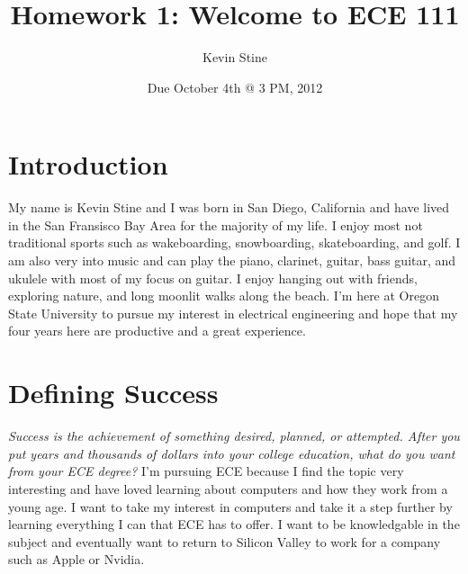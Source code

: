 \documentclass{article}
\title{Homework 1: Welcome to ECE 111}
\author{Kevin Stine}
\date{Due October 4th @ 3 PM, 2012}
\begin{document}
\maketitle

\section{Introduction}
My name is Kevin Stine and I was born in San Diego, California and have lived in the San Fransisco Bay Area for the majority of my life. I enjoy most not traditional sports such as wakeboarding, snowboarding, skateboarding, and golf. I am also very into music and can play the piano, clarinet, guitar, bass guitar, and ukulele with most of my focus on guitar. I enjoy hanging out with friends, exploring nature, and long moonlit walks along the beach. I'm here at Oregon State University to pursue my interest in electrical engineering and hope that my four years here are productive and a great experience. 
\newline
\newline


\section{Defining Success}
\emph{Success is the achievement of something desired, planned, or attempted. After you put years and thousands of dollars into your 
college education, what do you want from your ECE degree?}
\newline
\newline
I'm pursuing ECE because I find the topic very interesting and have loved learning about computers and how they work from a young age. I want to take my interest in computers and take it a step further by learning everything I can that ECE has to offer. I want to be knowledgable in the subject and eventually want to return to Silicon Valley to work for a company such as Apple or Nvidia. 
\end{document}
